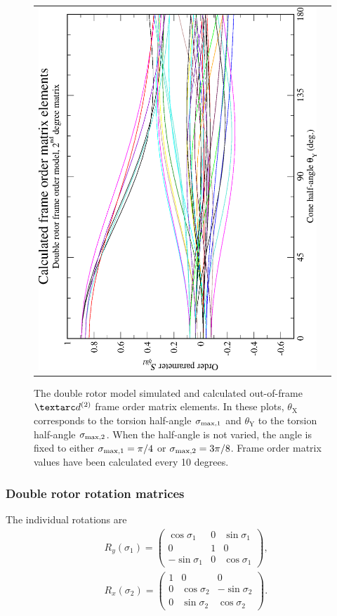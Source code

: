 \begin{figure}
\begin{tabular}{@{}cc@{}}
    \includegraphics[width=.35\textwidth,angle=270]{images/frame_order_matrix/Sijkl_double_rotor_out_of_frame_theta_y_calc.eps} \\
  \end{tabular}
  \caption[Double rotor simulated and calculated out-of-frame Daeg$^{(2)}$ elements.]{
    The double rotor model simulated and calculated out-of-frame $\FOtwo$ frame order matrix elements.
    In these plots, $\theta_\textrm{X}$ corresponds to the torsion half-angle $\sigma_{\textrm{max,1}}$ and $\theta_\textrm{Y}$ to the torsion half-angle $\sigma_{\textrm{max,2}}$.
    When the half-angle is not varied, the angle is fixed to either $\sigma_{\textrm{max,1}} = \pi/4$ or $\sigma_{\textrm{max,2}} = 3\pi/8$.
    Frame order matrix values have been calculated every 10 degrees.
  }
  \label{fig: simulated and calculated out-of-frame 2nd degree double rotor frame order}
\end{figure}


\subsubsection{Double rotor rotation matrices}

The individual rotations are
\begin{subequations}
\begin{align}
    &R_y(\sigma_1) =
        \begin{pmatrix}
             \cos\sigma_1 & 0 & \sin\sigma_1 \\
             0 &            1 & 0 \\
            -\sin\sigma_1 & 0 & \cos\sigma_1
        \end{pmatrix}, \\
    &R_x(\sigma_2) =
        \begin{pmatrix}
            1 & 0            &  0 \\
            0 & \cos\sigma_2 & -\sin\sigma_2 \\
            0 & \sin\sigma_2 &  \cos\sigma_2
        \end{pmatrix}.
\end{align}
\end{subequations}

